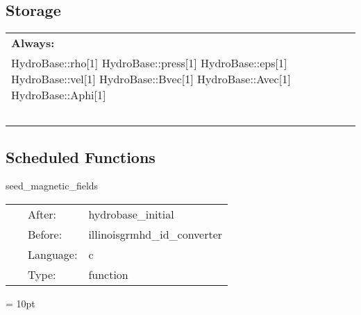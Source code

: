 \documentclass{article}
\begin{document}
\subsection*{Storage}

\hspace{5mm}

 \begin{tabular*}{160mm}{ll} 

{\bf Always:}&  ~ \\ 
 HydroBase::rho[1] HydroBase::press[1] HydroBase::eps[1] HydroBase::vel[1] HydroBase::Bvec[1] HydroBase::Avec[1] HydroBase::Aphi[1] & ~\\ 
~ & ~\\ 
\end{tabular*} 


\subsection*{Scheduled Functions}
\vspace{5mm}


\hspace{5mm} seed\_magnetic\_fields 

\hspace{5mm}{\it set up seed magnetic field configuration. } 


\hspace{5mm}

 \begin{tabular*}{160mm}{cll} 
~ & After:  & hydrobase\_initial \\ 
~ & Before:  & illinoisgrmhd\_id\_converter \\ 
~ & Language:  & c \\ 
~ & Type:  & function \\ 
\end{tabular*} 



\vspace{5mm}\parskip = 10pt 
\end{document}
